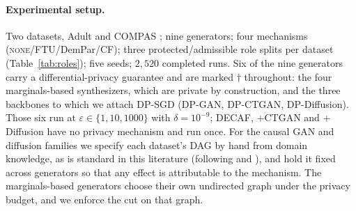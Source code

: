 \documentclass{article}
\begin{document}
\paragraph{Experimental setup.}
Two datasets, Adult \citep{becker1996adult} and COMPAS
\citep{angwin2016machinebias}; nine generators; four mechanisms
(\textsc{none}/FTU/DemPar/CF); three protected/admissible role splits per
dataset (Table~\ref{tab:roles}); five seeds; $2{,}520$ completed runs. Six of
the nine generators carry a differential-privacy guarantee
\citep{dwork2006calibrating} and are marked $\dagger$ throughout: the four
marginals-based synthesizers, which are private by construction, and the three
backbones to which we attach DP-SGD (DP-GAN, DP-CTGAN, DP-Diffusion). Those
six run at $\varepsilon \in \{1,10,1000\}$ with $\delta = 10^{-9}$; DECAF,
$+$CTGAN and $+$Diffusion have no privacy mechanism and run once. For the
causal GAN and diffusion families we specify each dataset's DAG by hand from
domain knowledge, as is standard in this literature (following
\citet{kusner2017counterfactual} and \citet{zhang2017causalframework}), and
hold it fixed across generators so that any effect is attributable to the
mechanism. The marginals-based generators choose their own undirected graph
under the privacy budget, and we enforce the cut on that graph.
\end{document}
